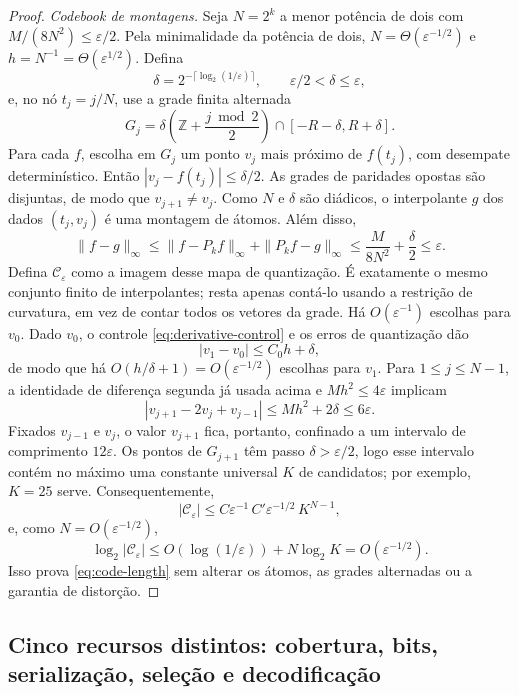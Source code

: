 \begin{proof}
\emph{Codebook de montagens.} Seja $N=2^k$ a menor potência de dois com $M/(8N^2)\le\varepsilon/2$. Pela minimalidade da potência de dois, $N=\Theta(\varepsilon^{-1/2})$ e $h=N^{-1}=\Theta(\varepsilon^{1/2})$. Defina
\[
 \delta=2^{-\lceil\log_2(1/\varepsilon)\rceil},
 \qquad \varepsilon/2<\delta\le\varepsilon,
\]
e, no nó $t_j=j/N$, use a grade finita alternada
\begin{equation}
 G_j=\delta\left(\mathbb{Z}+\frac{j\bmod2}{2}\right)
 \cap[-R-\delta,R+\delta].
 \label{eq:alternating-grid}
\end{equation}
Para cada $f$, escolha em $G_j$ um ponto $v_j$ mais próximo de $f(t_j)$, com desempate determinístico. Então $|v_j-f(t_j)|\le\delta/2$. As grades de paridades opostas são disjuntas, de modo que $v_{j+1}\neq v_j$. Como $N$ e $\delta$ são diádicos, o interpolante $g$ dos dados $(t_j,v_j)$ é uma montagem de átomos. Além disso,
\[
 \|f-g\|_\infty
 \le\|f-P_kf\|_\infty+\|P_kf-g\|_\infty
 \le\frac{M}{8N^2}+\frac\delta2\le\varepsilon.
\]
Defina $\mathcal C_\varepsilon$ como a imagem desse mapa de quantização.
É exatamente o mesmo conjunto finito de interpolantes; resta apenas contá-lo
usando a restrição de curvatura, em vez de contar todos os vetores da grade.
Há $O(\varepsilon^{-1})$ escolhas para $v_0$. Dado $v_0$, o controle
\eqref{eq:derivative-control} e os erros de quantização dão
\[
 |v_1-v_0|\le C_0h+\delta,
\]
de modo que há $O(h/\delta+1)=O(\varepsilon^{-1/2})$ escolhas para $v_1$.
Para $1\le j\le N-1$, a identidade de diferença segunda já usada acima e
$Mh^2\le4\varepsilon$ implicam
\[
 |v_{j+1}-2v_j+v_{j-1}|
 \le Mh^2+2\delta\le6\varepsilon.
\]
Fixados $v_{j-1}$ e $v_j$, o valor $v_{j+1}$ fica, portanto, confinado a um
intervalo de comprimento $12\varepsilon$. Os pontos de $G_{j+1}$ têm passo
$\delta>\varepsilon/2$, logo esse intervalo contém no máximo uma constante
universal $K$ de candidatos; por exemplo, $K=25$ serve. Consequentemente,
\[
 |\mathcal C_\varepsilon|
 \le C\varepsilon^{-1}\,C'\varepsilon^{-1/2}\,K^{N-1},
\]
e, como $N=O(\varepsilon^{-1/2})$,
\[
 \log_2|\mathcal C_\varepsilon|
 \le O(\log(1/\varepsilon))+N\log_2K
 =O(\varepsilon^{-1/2}).
\]
Isso prova \eqref{eq:code-length} sem alterar os átomos, as grades alternadas
ou a garantia de distorção.
\end{proof}

\subsection{Cinco recursos distintos: cobertura, bits, serialização, seleção e decodificação}

